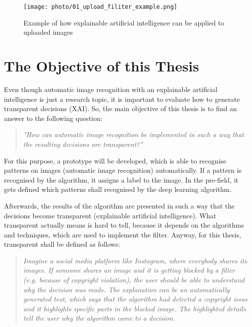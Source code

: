 \begin{figure}[!htp]
	\centering
	\texttt{[image: photo/01\_upload\_filiter\_example.png]}
	\caption{Example of how explainable artificial intelligence can be applied to uploaded images \cite{Visualiz76:online}}
	\label{fig:01_upload_filiter_example}
\end{figure}

\section{The Objective of this Thesis}
\label{sec:goal}

Even though automatic image recognition with an explainable artificial intelligence is just a research topic, it is important to evaluate how to generate transparent decisions (XAI). So, the main objective of this thesis is to find an answer to the following question:
\begin{quote}\textit{"How can automatic image recognition be implemented in such a way that the resulting decisions are transparent?"} \end{quote}
For this purpose, a prototype will be developed, which is able to recognise patterns on images (automatic image recognition) automatically. If a pattern is recognised by the algorithm, it assigns a label to the image.  In the pre-field,  it gets defined which patterns shall recognised by the deep learning algorithm. 

Afterwards, the results of the algorithm are presented in such a way that the decisions become transparent (explainable artificial intelligence). What transparent actually means is hard to tell, because it depends on the algorithms and techniques, which are used to implement the filter. Anyway, for this thesis, transparent shall be defined as follows:

\begin{quote}
	\textit{Imagine a social media platform like Instagram, where everybody shares its images. If someone shares an image and it is getting blocked by a filter (e.g. because of copyright violation), the user should be able to understand why the decision was made. The explanation can be an automatically generated text, which says that the algorithm had detected a copyright issue and it highlights specific parts in the blocked image. The highlighted details tell the user why the algorithm came to a decision.
	}
	
\end{quote}

